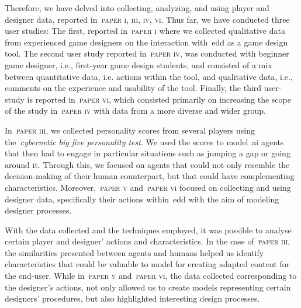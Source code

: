 
Therefore, we have delved into collecting, analyzing, and using player and designer data, reported in~\textsc{paper i, iii, iv, vi}. Thus far, we have conducted three user studies: The first, reported in~\textsc{paper i} where we collected qualitative data from experienced game designers on the interaction with~\acrshort{edd} as a game design tool. The second user study reported in~\textsc{paper iv}, was conducted with beginner game designer, i.e., first-year game design students, and consisted of a mix between quantitative data, i.e. actions within the tool, and qualitative data, i.e., comments on the experience and usability of the tool. Finally, the third user-study is reported in~\textsc{paper vi}, which consisted primarily on increasing the scope of the study in~\textsc{paper iv} with data from a more diverse and wider group.

In~\textsc{paper iii}, we collected personality scores from several players using the~\emph{cybernetic big five personality test}. We used the scores to model~\acrshort{ai} agents that then had to engage in particular situations such as jumping a gap or going around it. Through this, we focused on agents that could not only resemble the decision-making of their human counterpart, but that could have complementing characteristics. Moreover,~\textsc{paper v} and~\textsc{paper vi} focused on collecting and using designer data, specifically their actions within~\acrshort{edd} with the aim of modeling designer processes.

With the data collected and the techniques employed, it was possible to analyse certain player and designer' actions and characteristics. In the case of~\textsc{paper iii}, the similarities presented between agents and humans helped us identify characteristics that could be valuable to model for creating adapted content for the end-user. While in~\textsc{paper v} and~\textsc{paper vi}, the data collected corresponding to the designer's actions, not only allowed us to create models representing certain designers' procedures, but also highlighted interesting design processes.


